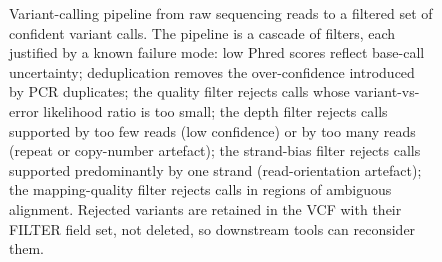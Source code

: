 \begin{figure}[htbp]
\caption[Variant-calling pipeline]{Variant-calling pipeline from
raw sequencing reads to a filtered set of confident variant calls.
The pipeline is a cascade of filters, each justified by a known
failure mode: low Phred scores reflect base-call uncertainty;
deduplication removes the over-confidence introduced by PCR
duplicates; the quality filter rejects calls whose variant-vs-error
likelihood ratio is too small; the depth filter rejects calls
supported by too few reads (low confidence) or by too many reads
(repeat or copy-number artefact); the strand-bias filter rejects
calls supported predominantly by one strand (read-orientation
artefact); the mapping-quality filter rejects calls in regions of
ambiguous alignment. Rejected variants are retained in the VCF with
their FILTER field set, not deleted, so downstream tools can
reconsider them.}
\label{fig:vol06:ch11:variant-pipeline}
\end{figure}
